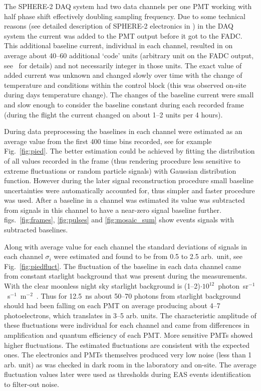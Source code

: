 \documentclass[final,5p,times,twocolumn]{elsarticle}
\begin{document}
The \mbox{SPHERE-2} DAQ system had two data channels per one PMT working with half phase shift effectively doubling sampling frequency. Due to some technical reasons (see detailed description of \mbox{SPHERE-2} electronics in \cite{Ant15a}) in the DAQ system the current was added to the PMT output before it got to the FADC. This additional baseline current, individual in each channel, resulted in on average about 40--60 additional `code' units (arbitrary unit on the FADC output, see~\cite{Ant16} for details) and not necessarily integer in those units. The exact value of added current was unknown and changed slowly over time with the change of temperature and conditions within the control block (this was observed on-site during days temperature change). The changes of the baseline current were small and slow enough to consider the baseline constant during each recorded frame (during the flight the current changed on about 1--2 units per 4 hours). 

During data preprocessing the baselines in each channel were estimated as an average value from the first 400 time bins recorded, see for example Fig.~\ref{fig:pied}. The better estimation could be achieved by fitting the distribution of all values recorded in the frame (thus rendering procedure less sensitive to extreme fluctuations or random particle signals) with Gaussian distribution function. However during the later signal reconstruction procedure small baseline uncertainties were automatically accounted for, thus simpler and faster procedure was used. After a baseline in a channel was estimated its value was subtracted from signals in this channel to have a near-zero signal baseline further. figs.~\ref{fig:frames}, \ref{fig:pulses} and \ref{fig:mosaic_sum} show events signals with 
subtracted baselines.

Along with average value for each channel the standard deviations of signals in each channel $\sigma_i$ were estimated and found to be from 0.5 to 2.5 arb.~unit, see  Fig.~\ref{fig:piedfluct}. The fluctuation of the baseline in each data channel came from constant starlight background that was present during the measurements. With the clear moonless night sky starlight background is (1--2)$\cdot10^{12}$~photon~sr$^{-1}$~s$^{-1}$~m$^{-2}$~\cite{starlightbackground}. Thus for 12.5~ns about 50--70 photons from starlight background should had been falling on each PMT on average producing about 4--7 photoelectrons, which translates in 3--5 arb. units. The characteristic amplitude of these fluctuations were individual for each channel and came from differences in amplification and quantum efficiency of each PMT. More sensitive PMTs showed higher fluctuations. The estimated fluctuations are consistent with the expected ones. The electronics and PMTs themselves produced very low noise (less than 1 arb. unit) as was checked in dark room in the laboratory and on-site. The average fluctuation values later were used as thresholds during EAS events identification to filter-out noise. 
\end{document}
